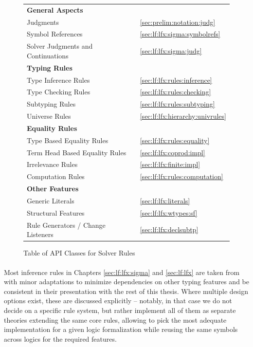 \begin{figure}[ht]%
  \begin{framed}
      \begin{tabular}{l|l}
      	\textbf{General Aspects} & \\
      	\mmt Judgments & \autoref{sec:prelim:notation:judg} \\
      	Symbol References & \autoref{sec:lf:lfx:sigma:symbolrefs} \\
      	Solver Judgments and Continuations & \autoref{sec:lf:lfx:sigma:judg} \\\hline
      	\textbf{Typing Rules} & \\
      	Type Inference Rules & \autoref{sec:lf:lfx:rules:inference} \\
      	Type Checking Rules & \autoref{sec:lf:lfx:rules:checking} \\
      	Subtyping Rules & \autoref{sec:lf:lfx:rules:subtyping} \\
      	Universe Rules & \autoref{sec:lf:lfx:hierarchy:univrules} \\\hline
      	\textbf{Equality Rules} & \\
      	Type Based Equality Rules & \autoref{sec:lf:lfx:rules:equality} \\
      	Term Head Based Equality Rules & \autoref{sec:lf:lfx:coprod:impl} \\
      	Irrelevance Rules & \autoref{sec:lf:lfx:finite:impl} \\
      	Computation Rules & \autoref{sec:lf:lfx:rules:computation} \\\hline
      	\textbf{Other Features} & \\
      	Generic Literals & \autoref{sec:lf:lfx:literals} \\
      	Structural Features & \autoref{sec:lf:lfx:wtypes:sf} \\
      	Rule Generators / Change Listeners & \autoref{sec:lf:lfx:declsubtp}
      \end{tabular}
\end{framed}
  \caption{Table of \mmt API Classes for Solver Rules}\label{fig:lf:rulestoc}%
\end{figure}

\paragraph{} Most inference rules in Chapters \ref{sec:lf:lfx:sigma} and \ref{sec:lf:lfx} are taken from \cite{hottbook} with minor adaptations to minimize dependencies on other typing features and be consistent in their presentation with the rest of this thesis. Where multiple design options exist, these are discussed explicitly -- notably, in that case we do not decide on a specific rule system, but rather implement all of them as separate theories extending the same core rules, allowing to pick the most adequate implementation for a given logic formalization while reusing the same symbols across logics for the required features.
